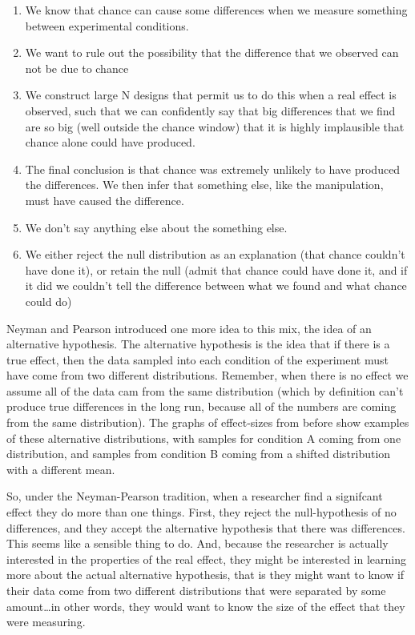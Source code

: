 \documentclass[
  letterpaper,
  DIV=11,
  numbers=noendperiod]{scrreprt}
\providecommand{\tightlist}{%
  \setlength{\itemsep}{0pt}\setlength{\parskip}{0pt}}
\begin{document}
\begin{enumerate}
\def\labelenumi{\arabic{enumi}.}
\tightlist
\item
  We know that chance can cause some differences when we measure
  something between experimental conditions.
\item
  We want to rule out the possibility that the difference that we
  observed can not be due to chance
\item
  We construct large N designs that permit us to do this when a real
  effect is observed, such that we can confidently say that big
  differences that we find are so big (well outside the chance window)
  that it is highly implausible that chance alone could have produced.
\item
  The final conclusion is that chance was extremely unlikely to have
  produced the differences. We then infer that something else, like the
  manipulation, must have caused the difference.
\item
  We don't say anything else about the something else.
\item
  We either reject the null distribution as an explanation (that chance
  couldn't have done it), or retain the null (admit that chance could
  have done it, and if it did we couldn't tell the difference between
  what we found and what chance could do)
\end{enumerate}

Neyman and Pearson introduced one more idea to this mix, the idea of an
alternative hypothesis. The alternative hypothesis is the idea that if
there is a true effect, then the data sampled into each condition of the
experiment must have come from two different distributions. Remember,
when there is no effect we assume all of the data cam from the same
distribution (which by definition can't produce true differences in the
long run, because all of the numbers are coming from the same
distribution). The graphs of effect-sizes from before show examples of
these alternative distributions, with samples for condition A coming
from one distribution, and samples from condition B coming from a
shifted distribution with a different mean.

So, under the Neyman-Pearson tradition, when a researcher find a
signifcant effect they do more than one things. First, they reject the
null-hypothesis of no differences, and they accept the alternative
hypothesis that there was differences. This seems like a sensible thing
to do. And, because the researcher is actually interested in the
properties of the real effect, they might be interested in learning more
about the actual alternative hypothesis, that is they might want to know
if their data come from two different distributions that were separated
by some amount\ldots in other words, they would want to know the size of
the effect that they were measuring.
\end{document}
